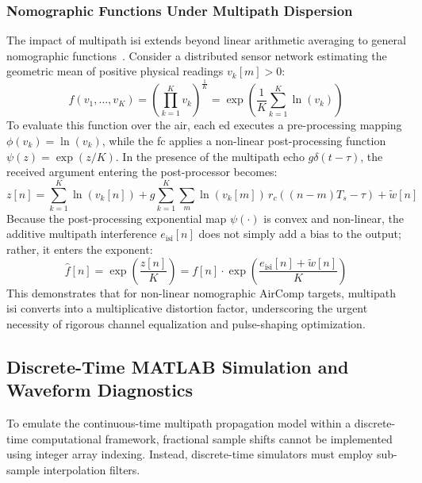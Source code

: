 \documentclass[Markos_Delaportas_1316.tex]{subfiles}
\begin{document}
\subsubsection{Nomographic Functions Under Multipath Dispersion}
\label{subsubsec:nomographic_functions_isi}
The impact of multipath \gls{isi} extends beyond linear arithmetic
averaging to general nomographic
functions~\cite{goldenbaum_nomographic_2015,goldenbaum_analyzing_2011}.
Consider a
distributed sensor network estimating the geometric mean of positive
physical readings $v_k[m] > 0$:
\begin{equation}
    f(v_1, \dots, v_K) = \left( \prod_{k=1}^K v_k
    \right)^{\frac{1}{K}} = \exp\left( \frac{1}{K} \sum_{k=1}^K \ln(v_k) \right)
    \label{eq:geometric_mean_nomographic}
\end{equation}
To evaluate this function over the air, each \gls{ed} executes a
pre-processing mapping $\phi(v_k) = \ln(v_k)$, while the
\gls{fc} applies a non-linear post-processing function $\psi(z) =
\exp(z / K)$. In the presence of the multipath echo
$g \delta(t - \tau)$, the received argument entering the post-processor becomes:
\begin{equation}
    z[n] = \sum_{k=1}^K \ln(v_k[n]) + g \sum_{k=1}^K \sum_{m}
    \ln(v_k[m]) \, r_c((n-m)T_s - \tau) + \tilde{w}[n]
    \label{eq:nomographic_argument_corrupted}
\end{equation}
Because the post-processing exponential map $\psi(\cdot)$ is convex
and non-linear, the additive multipath interference
$e_{\text{isi}}[n]$ does not simply add a bias to the output; rather,
it enters the exponent:
\begin{equation}
    \hat{f}[n] = \exp\left( \frac{z[n]}{K} \right) = f[n] \cdot
    \exp\left( \frac{e_{\text{isi}}[n] + \tilde{w}[n]}{K} \right)
    \label{eq:multiplicative_nomographic_distortion}
\end{equation}
This demonstrates that for non-linear nomographic AirComp targets,
multipath \gls{isi} converts into a multiplicative
distortion factor, underscoring the urgent necessity of rigorous
channel equalization and pulse-shaping optimization.

\subsection{Discrete-Time MATLAB Simulation and Waveform Diagnostics}
\label{subsec:matlab_simulation_and_diagnostics}
To emulate the continuous-time multipath propagation model within a
discrete-time computational framework, fractional
sample shifts cannot be implemented using integer array indexing.
Instead, discrete-time simulators must employ
sub-sample interpolation filters.
\end{document}
